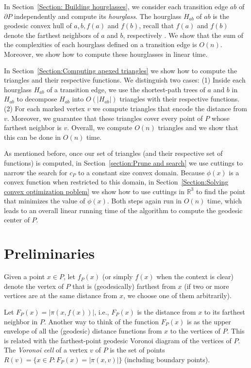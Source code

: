 \documentclass[a4paper,UKenglish]{lipics}
\newcommand{\F}[2]{\ensuremath{F_{\scriptscriptstyle #1}(#2)}}
\newcommand{\f}[2]{\ensuremath{f_{\scriptscriptstyle #1}(#2)}}
\newcommand{\ff}[1]{\ensuremath{f(#1)}}
\newcommand{\cp}{\ensuremath{c_P}}
\newcommand{\g}[2]{\ensuremath{|\pi(#1, #2)|}}
\begin{document}
In Section~\ref{Section: Building hourglasses}, we consider each transition edge $ab$ of $\partial P$ independently and compute its \emph{hourglass}. The hourglass $H_{ab}$ of $ab$ is the geodesic convex hull of $a,b, \ff{a}$ and $\ff{b}$, recall that $\ff{a}$ and $\ff{b}$ denote the farthest neighbors of $a$ and $b$, respectively . 
We show that the sum of the complexities of each hourglass defined on a transition edge is $O(n)$. 
Moreover, we show how to compute these hourglasses in linear time.

In Section~\ref{Section:Computing apexed triangles} we show how to compute the triangles and their respective functions.
We distinguish two cases: (1) Inside each hourglass $H_{ab}$ of a transition edge, we use the shortest-path trees of $a$ and $b$ in $H_{ab}$ to decompose $H_{ab}$ into $O(|H_{ab}|)$ triangles with their respective functions. 
(2) For each marked vertex $v$ we compute triangles that encode the distance from $v$. Moreover, we guarantee that these triangles cover every point of $P$ whose farthest neighbor is $v$. Overall, we compute $O(n)$ triangles and we show that this can be done in $O(n)$ time.

As mentioned before, once our set of triangles (and their respective set of functions) is computed, in Section~\ref{section:Prune and search} we use cuttings to narrow the search for $\cp$ to a constant size convex domain.
Because $\phi(x)$ is a convex function when restricted to this domain, in Section~\ref{Section:Solving convex optimization poblem} we show how to use cuttings in $\mathbb{R}^3$ to find the point that minimizes the value of $\phi(x)$. Both steps again run in $O(n)$ time, which leads to an overall linear running time of the algorithm to compute the geodesic center of $P$.



\section{Preliminaries}
Given a point $x\in P$, let $\f{P}{x}$ (or simply $\ff{x}$ when the context is clear) denote the vertex of $P$ that is (geodesically) farthest from $x$ (if two or more vertices are at the same distance from $x$, we choose one of them arbitrarily). 


Let $\F{P}{x} = \g{x}{\ff{x}}$, i.e., $\F{P}{x}$ is the distance from $x$ to its farthest neighbor in $P$. 
Another way to think of the function $\F{P}{x}$ is as the upper envelope of all the (geodesic) distance functions from $x$ to the vertices of $P$. This is related with the farthest-point geodesic Voronoi diagram of the vertices of $P$. The \emph{Voronoi cell} of a vertex $v$ of $P$ is the set of points $R(v) = \{x\in P : \F{P}{x} = \g{x}{v}\}$ (including boundary points).
\end{document}
